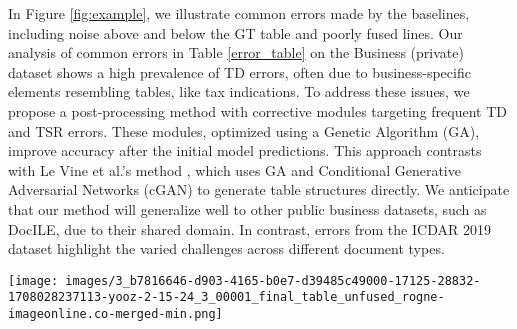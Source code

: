 In Figure \ref{fig:example}, we illustrate common errors made by the baselines, including noise above and below the GT table and poorly fused lines. Our analysis of common errors in Table \ref{error_table} on the Business (private) dataset shows a high prevalence of TD errors, often due to business-specific elements resembling tables, like tax indications. To address these issues, we propose a post-processing method with corrective modules targeting frequent TD and TSR errors. These modules, optimized using a Genetic Algorithm (GA)\cite{holland1992adaptation}, improve accuracy after the initial model predictions. This approach contrasts with Le Vine et al.'s method \cite{Vine2019ExtractingTF}, which uses GA and Conditional Generative Adversarial Networks (cGAN) \cite{Isola2016ImagetoImageTW} to generate table structures directly. We anticipate that our method will generalize well to other public business datasets, such as DocILE, due to their shared domain. In contrast, errors from the ICDAR 2019 dataset highlight the varied challenges across different document types.


\begin{figure*}[t]
  \centering
   \texttt{[image: images/3\_b7816646-d903-4165-b0e7-d39485c49000-17125-28832-1708028237113-yooz-2-15-24\_3\_00001\_final\_table\_unfused\_rogne-imageonline.co-merged-min.png]}

   \caption{Baseline prediction VS Ground-Truth on anonymised private data. Common errors (on the left) generally include mistakes in line fusion and over detected cells that can be seen as noise for the structure recognition step.}
   \label{fig:example}
\end{figure*}